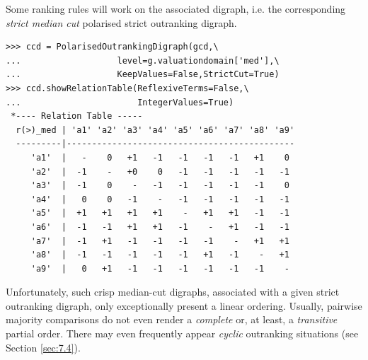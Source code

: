 Some ranking rules will work on the associated \Condorcet digraph, i.e. the corresponding \emph{strict median cut} polarised strict outranking digraph.
 \begin{lstlisting}[caption={Median cut polarised strict outranking relation characteristics},label=list:8.2]
>>> ccd = PolarisedOutrankingDigraph(gcd,\
...                   level=g.valuationdomain['med'],\
...                   KeepValues=False,StrictCut=True)
>>> ccd.showRelationTable(ReflexiveTerms=False,\
...                       IntegerValues=True)
 *---- Relation Table -----
  r(>)_med | 'a1' 'a2' 'a3' 'a4' 'a5' 'a6' 'a7' 'a8' 'a9'   
  ---------|---------------------------------------------
     'a1'  |   -    0   +1   -1   -1   -1   -1   +1    0  
     'a2'  |  -1    -   +0    0   -1   -1   -1   -1   -1  
     'a3'  |  -1    0    -   -1   -1   -1   -1   -1    0  
     'a4'  |   0    0   -1    -   -1   -1   -1   -1   -1  
     'a5'  |  +1   +1   +1   +1    -   +1   +1   -1   -1  
     'a6'  |  -1   -1   +1   +1   -1    -   +1   -1   -1  
     'a7'  |  -1   +1   -1   -1   -1   -1    -   +1   +1  
     'a8'  |  -1   -1   -1   -1   -1   +1   -1    -   +1  
     'a9'  |   0   +1   -1   -1   -1   -1   -1   -1    -   
\end{lstlisting}

Unfortunately, such crisp median-cut \Condorcet digraphs, associated with a given strict outranking digraph, only exceptionally present a linear ordering. Usually, pairwise majority comparisons do not even render a \emph{complete} or, at least, a \emph{transitive} partial order. There may even frequently appear \emph{cyclic} outranking situations (see Section \ref{sec:7.4}).

